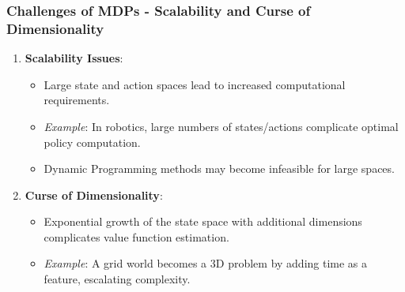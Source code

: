 \documentclass[aspectratio=169]{beamer}
\begin{document}
\begin{frame}[fragile]
    \frametitle{Challenges of MDPs - Scalability and Curse of Dimensionality}
    \begin{enumerate}
        \item \textbf{Scalability Issues}:
        \begin{itemize}
            \item Large state and action spaces lead to increased computational requirements.
            \item \textit{Example}: In robotics, large numbers of states/actions complicate optimal policy computation.
            \item Dynamic Programming methods may become infeasible for large spaces.
        \end{itemize}
        
        \item \textbf{Curse of Dimensionality}:
        \begin{itemize}
            \item Exponential growth of the state space with additional dimensions complicates value function estimation.
            \item \textit{Example}: A grid world becomes a 3D problem by adding time as a feature, escalating complexity.
        \end{itemize}
    \end{enumerate}
\end{frame}
\end{document}
